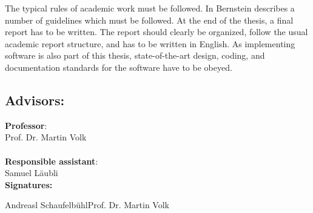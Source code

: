\documentclass{task_description}
\begin{document}
The typical rules of academic work must be followed. In
\cite{Bernstein:8} Bernstein describes a number of guidelines which
must be followed. At the end of the thesis, a final report has to be
written. The report should clearly be organized, follow the usual academic
report structure, and has to be written in English. As implementing software is also part of this thesis, state-of-the-art
design, coding, and documentation standards for the software have to be obeyed.

\subsection*{Advisors:}

\noindent\textbf{Professor}: \\
\noindent Prof. Dr. Martin Volk \\
\\
\noindent\textbf{Responsible assistant}: \\
\noindent Samuel L\"aubli \\

\vspace{2em}
\noindent\textbf{Signatures:}

\vspace{3\baselineskip}
\noindent Andreasl Schaufelb\"uhl\hfill Prof. Dr. Martin Volk
\clearpage


\end{document}
